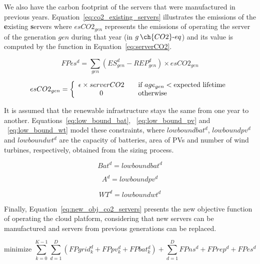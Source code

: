 We also have the carbon footprint of the servers that were manufactured in previous years. Equation~\eqref{eq:co2_existing_servers} illustrates the emissions of the \textbf{e}xisting \textbf{s}ervers where $esCO2_{gen}$ represents the emissions of operating the server of the generation $gen$ during that year (in $g\,\ch{CO2}\text{-}eq$) and its value is computed by the function in Equation~\eqref{eq:serverCO2}.


\begin{equation} \label{eq:co2_existing_servers}
FPes^d = \sum_{gen} (ES_{gen}^d - REP_{gen}^d)  \times esCO2_{gen}
\end{equation}


\begin{equation} \label{eq:serverCO2}
esCO2_{gen} =  \left\{ 
  \begin{array}{ c l }
    \epsilon \times serverCO2   & \quad \textrm{if $age_{gen}$}    < \textrm{expected lifetime}   \\
    0     & \quad \textrm{otherwise  } \\
  \end{array}
\right.
\end{equation}

It is assumed that the renewable infrastructure stays the same from one year to another. Equations~\eqref{eq:low_bound_bat},  ~\eqref{eq:low_bound_pv} and ~\eqref{eq:low_bound_wt} model these constraints, where $lowboundbat^d$, $lowboundpv^d$ and $lowboundwt^d$ are the capacity of batteries, area of PVs and number of wind turbines, respectively, obtained from the sizing process.

\begin{equation} \label{eq:low_bound_bat}
Bat^d = lowboundbat^d
\end{equation}

\begin{equation} \label{eq:low_bound_pv}
A^d = lowboundpv^d
\end{equation}

\begin{equation} \label{eq:low_bound_wt}
WT^d = lowboundwt^d
\end{equation}


Finally, Equation~\eqref{eq:new_obj_co2_servers} presents the new objective function of operating the cloud platform, considering that new servers can be manufactured and servers from previous generations can be replaced.

\begin{equation} \label{eq:new_obj_co2_servers}
\text{minimize }\sum_{k=0}^{K-1} \sum_{d=1}^D (FPgrid^d_k +  FPpv^d_k + FPbat^d_k) + \sum_{d=1}^D   FPns^d + FPrep^d + FPes^d 
\end{equation}

